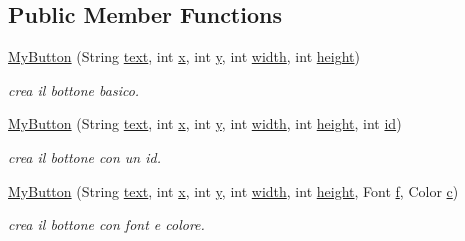 \subsection*{Public Member Functions}
\begin{DoxyCompactItemize}
\item 
\hyperlink{classui_1_1_my_button_a1cad8afed447e8f9cd96d84acb16f139}{My\+Button} (String \hyperlink{classui_1_1_my_button_a685ed5195435d2b3e75433f46aec6e1e}{text}, int \hyperlink{classui_1_1_my_button_a6150e0515f7202e2fb518f7206ed97dc}{x}, int \hyperlink{classui_1_1_my_button_a0a2f84ed7838f07779ae24c5a9086d33}{y}, int \hyperlink{classui_1_1_my_button_a2474a5474cbff19523a51eb1de01cda4}{width}, int \hyperlink{classui_1_1_my_button_ad12fc34ce789bce6c8a05d8a17138534}{height})
\begin{DoxyCompactList}\small\item\em crea il bottone basico. \end{DoxyCompactList}\item 
\hyperlink{classui_1_1_my_button_a6ee5c6115a641ea511e6928b7dc35b08}{My\+Button} (String \hyperlink{classui_1_1_my_button_a685ed5195435d2b3e75433f46aec6e1e}{text}, int \hyperlink{classui_1_1_my_button_a6150e0515f7202e2fb518f7206ed97dc}{x}, int \hyperlink{classui_1_1_my_button_a0a2f84ed7838f07779ae24c5a9086d33}{y}, int \hyperlink{classui_1_1_my_button_a2474a5474cbff19523a51eb1de01cda4}{width}, int \hyperlink{classui_1_1_my_button_ad12fc34ce789bce6c8a05d8a17138534}{height}, int \hyperlink{classui_1_1_my_button_a7441ef0865bcb3db9b8064dd7375c1ea}{id})
\begin{DoxyCompactList}\small\item\em crea il bottone con un id. \end{DoxyCompactList}\item 
\hyperlink{classui_1_1_my_button_a2ccc37cb50eaf8c8f8ecdb7649bbe10e}{My\+Button} (String \hyperlink{classui_1_1_my_button_a685ed5195435d2b3e75433f46aec6e1e}{text}, int \hyperlink{classui_1_1_my_button_a6150e0515f7202e2fb518f7206ed97dc}{x}, int \hyperlink{classui_1_1_my_button_a0a2f84ed7838f07779ae24c5a9086d33}{y}, int \hyperlink{classui_1_1_my_button_a2474a5474cbff19523a51eb1de01cda4}{width}, int \hyperlink{classui_1_1_my_button_ad12fc34ce789bce6c8a05d8a17138534}{height}, Font \hyperlink{classui_1_1_my_button_a3fb562f10e8f7f83cb2ed130eab6d439}{f}, Color \hyperlink{classui_1_1_my_button_a02094092ae89aa4b23bff1976bcbf90d}{c})
\begin{DoxyCompactList}\small\item\em crea il bottone con font e colore. \end{DoxyCompactList}\item 

\end{DoxyCompactItemize}
